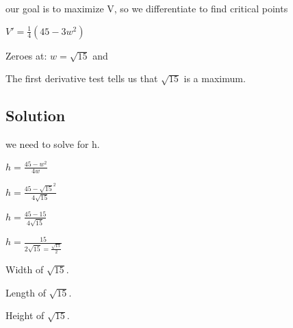 \documentclass[12pt,a4paper]{article}
\begin{document}
\noindent our goal is to maximize V, so we differentiate to find critical points

\noindent $V' = \frac{1}{4} (45 - 3w^2)$

\noindent Zeroes at: $w = \sqrt{15}$ and 

\noindent The first derivative test tells us that $\sqrt{15}$ is a maximum.

\subsection*{Solution}

we need to solve for h.

$h = \frac{45 - w^2}{4w}$

$h = \frac{45-\sqrt{15}^2}{4\sqrt{15}}$

$h = \frac{45 - 15}{4\sqrt{15}}$

$h = \frac{15}{2\sqrt{15} = \frac{\sqrt{15}}{2}}$

Width of $\sqrt{15}$.

Length of $\sqrt{15}$.

Height of $\sqrt{15}$.
\end{document}
